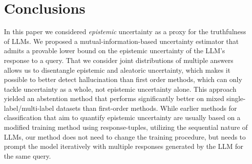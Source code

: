 \documentclass[a4paper]{article}
\theoremstyle{plain}
\theoremstyle{definition}
\theoremstyle{plain}
\begin{document}
\section{Conclusions}
In this paper we considered \emph{epistemic} uncertainty as a proxy for the truthfulness of LLMs. We proposed a mutual-information-based uncertainty estimator that admits a provable lower bound on the epistemic uncertainty of the LLM's response to a query. That we consider joint distributions of multiple answers allows us to disentangle epistemic and aleatoric uncertainty, which makes it possible to better detect hallucination than first order methods, which can only tackle uncertainty as a whole, not epistemic uncertainty alone. This approach yielded an abstention method that performs significantly better on mixed single-label/multi-label datasets than first-order methods. While earlier methods for classification that aim to quantify epistemic uncertainty are usually based on a modified training method using response-tuples, utilizing the sequential nature of LLMs, our method does not need to change the training procedure, but needs to prompt the model iteratively with multiple responses generated by the LLM for the same query.






\clearpage

\appendix


\clearpage


\clearpage


\clearpage


\clearpage


\clearpage
\end{document}
